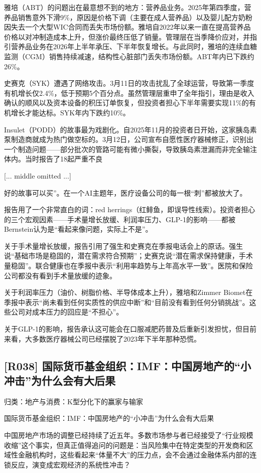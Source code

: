 \documentclass[11pt]{ctexart}
\begin{document}
雅培（ABT）的问题出在最意想不到的地方：营养品业务。2025年第四季度，营养品销售意外下滑9\%，原因是价格下调（主要在成人营养品）以及婴儿配方奶粉因失去一个大型WIC合同而丢失市场份额。雅培自2022年以来一直在提高营养品价格以对冲制造成本上升，但涨价最终压低了销量。管理层在当季降价应对，并指引营养品业务在2026年上半年承压、下半年恢复增长。与此同时，雅培的连续血糖监测（CGM）销售持续减速，结构性心脏部门丢失市场份额。ABT年内已下跌约26\%。

史赛克（SYK）遭遇了网络攻击。3月11日的攻击扰乱了全球运营，导致第一季度有机增长仅2.4\%，低于预期5个百分点。虽然管理层重申了全年指引，理由是收入确认的顺风以及资本设备的积压订单恢复，但投资者担心下半年需要实现11\%的有机增长才能达标。SYK年内下跌约10\%。

Insulet（PODD）的故事最为戏剧化。自2025年11月的投资者日开始，这家胰岛素泵制造商就成为热门做空标的。3月12日，公司宣布自愿性医疗器械修正，识别出一个制造问题——部分批次的管路可能有微小撕裂，导致胰岛素泄漏而非完全输注体内。当时报告了18起严重不良

[... middle omitted ...]

好的故事可以买”。在一个AI主题年，医疗设备公司的每一根“刺”都被放大了。

报告用了一个非常直白的词：red herrings（红鲱鱼，即误导性线索）。投资者担心的三个宏观因素——手术量增长放缓、利润率压力、GLP-1的影响——都被Bernstein认为是“看起来像问题，实际上不是”。

关于手术量增长放缓，报告引用了强生和史赛克在季报电话会上的原话。强生说“基础市场是稳固的，潜在需求符合预期”；史赛克说“潜在需求保持健康，手术量稳固”。联合健康也在季报中表示“利用率趋势与上年高水平一致”。医院和保险公司都没有看到手术量放缓的迹象。

关于利润率压力（油价、树脂价格、半导体成本上升），雅培和Zimmer Biomet在季报中表示“尚未看到任何实质性的供应中断”和“目前没有看到任何分销挑战”。这些公司对成本压力的回应是“不担心”。

关于GLP-1的影响，报告承认这可能会在口服减肥药普及后重新引发担忧，但目前来看，大多数医疗器械公司已经摆脱了2023年下半年那种恐慌。

\subsection{[R038] 国际货币基金组织：IMF：中国房地产的“小冲击”为什么会有大后果}
{\small\color{refgray}归类：地产与消费：K型分化下的赢家与输家}

国际货币基金组织：IMF：中国房地产的“小冲击”为什么会有大后果

中国房地产市场的调整已经持续了近五年。多数市场参与者已经接受了“行业规模收缩”这个事实，但真正值得追问的问题是：当风险集中在特定类型的开发商和区域性金融机构时，这些看起来“体量不大”的压力点，会不会通过金融体系内部的连锁反应，演变成宏观经济的系统性冲击？
\end{document}
